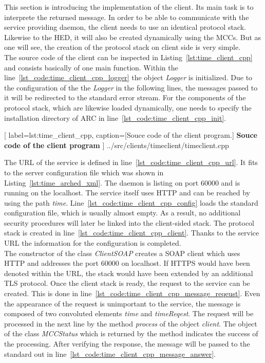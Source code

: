This section is introducing the implementation of the client.
Its main task is to interprete the returned message.
In order to be able to communicate with the service providing daemon, the client needs to use an identical protocol stack.
Likewise to the HED, it will also be created dynamically using the MCCs.
But as one will see, the creation of the protocol stack on client side is very simple.\\

The source code of the client can be inspected in Listing~\ref{lst:time_client_cpp} and consists basically of one main function.
Within the line~\ref{lst_code:time_client_cpp_logger} the object \textit{Logger} is initialized.
Due to the configuration of the the \textit{Logger} in the following lines, the messages passed to it will be redirected to the standard error stream.  For the components of the protocol stack, which  are likewise loaded dynamically, one needs to specify the installation directory of ARC in line~\ref{lst_code:time_client_cpp_init}.\\

	[
	label=lst:time_client_cpp,
	caption={[Souce code of the client program.]
	\textbf{Souce code of the client program}}
	]
{../src/clients/timeclient/timeclient.cpp}
 

The URL of the service is defined in line~\ref{lst_code:time_client_cpp_url}.
It fits to the server configuration file which was shown in Listing~\ref{lst:time_arched_xml}.
The daemon is listing on port 60000 and is running on the localhost. The service itself uses HTTP and can be reached by using the path \textit{time}.
Line~\ref{lst_code:time_client_cpp_config} loads the standard configuration file, which is usually almost empty.
As a result, no additional security procedures will later be linked into the client-sided stack. 
The protocol stack is created in line~\ref{lst_code:time_client_cpp_client}. 
Thanks to the service URL the information for the configuration is completed.\\


The constructor of the class \textit{ClientSOAP} creates a SOAP client which uses HTTP and addresses the port 60000 on localhost.
If HTTPS would have been denoted within the URL, the stack would have been extended by an additional TLS protocol.
Once the client stack is ready, the request to the service can be created.
This is done in line~\ref{lst_code:time_client_cpp_message_reqeust}.
Even the appearance of the request is unimportant to the service, the message is composed of two convoluted elements \textit{time} and \textit{timeReqest}. 
The request will be processed in the next line by the method \textit{process} of the object \textit{client}. %
The object of the class \textit{MCCStatus} which is returned by the method indicates the success of the processing.
After verifying the response, the message will be passed to the standard out in line~\ref{lst_code:time_client_cpp_message_answer}. \\


